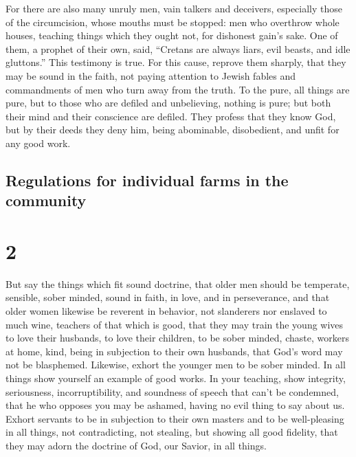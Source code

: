  For there are also many unruly men, vain talkers and
deceivers, especially those of the circumcision,  whose
mouths must be stopped: men who overthrow whole houses, teaching things
which they ought not, for dishonest gain's sake.  One of
them, a prophet of their own, said, ``Cretans are always liars, evil
beasts, and idle gluttons.''  This testimony is true. For
this cause, reprove them sharply, that they may be sound in the faith,
 not paying attention to Jewish fables and commandments
of men who turn away from the truth.  To the pure, all
things are pure, but to those who are defiled and unbelieving, nothing
is pure; but both their mind and their conscience are defiled.
 They profess that they know God, but by their deeds they
deny him, being abominable, disobedient, and unfit for any good work.

\hypertarget{regulations-for-individual-farms-in-the-community}{%
\subsection{Regulations for individual farms in the
community}\label{regulations-for-individual-farms-in-the-community}}

\hypertarget{section-1}{%
\section{2}\label{section-1}}

 But say the things which fit sound doctrine,
 that older men should be temperate, sensible, sober
minded, sound in faith, in love, and in perseverance,  and
that older women likewise be reverent in behavior, not slanderers nor
enslaved to much wine, teachers of that which is good, 
that they may train the young wives to love their husbands, to love
their children,  to be sober minded, chaste, workers at
home, kind, being in subjection to their own husbands, that God's word
may not be blasphemed.  Likewise, exhort the younger men
to be sober minded.  In all things show yourself an
example of good works. In your teaching, show integrity, seriousness,
incorruptibility,  and soundness of speech that can't be
condemned, that he who opposes you may be ashamed, having no evil thing
to say about us.  Exhort servants to be in subjection to
their own masters and to be well-pleasing in all things, not
contradicting,  not stealing, but showing all good
fidelity, that they may adorn the doctrine of God, our Savior, in all
things.

